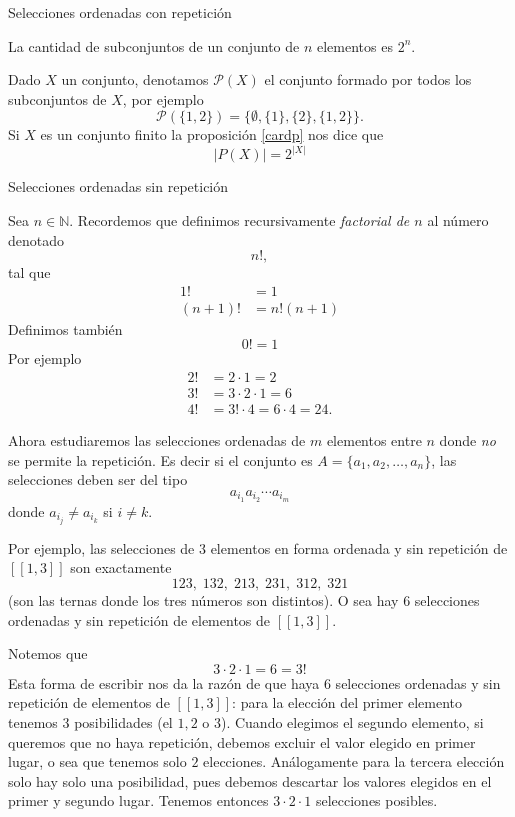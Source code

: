 \begin{section}{Selecciones ordenadas con repetición}
\begin{ejemplo}
\begin{proposicion}\label{cardp} La cantidad de subconjuntos de  
un conjunto de $n$ elementos es $2^n$.
\end{proposicion}

Dado  $X$ un conjunto, denotamos $\mathcal P(X)$ el  conjunto  formado por todos los subconjuntos de $X$, por ejemplo
$$
\mathcal P(\{1,2\}) = \{\emptyset,\{1\},\{2\},\{1,2\}\}.
$$  
Si $X$ es un conjunto finito la proposición \ref{cardp} nos dice que
$$
\mathcal |P(X)| = 2^{|X|}
$$
\end{ejemplo}





\end{section}

\begin{section}{Selecciones ordenadas sin repetición}\label{permutaciones}

Sea $n \in \mathbb{N}$. Recordemos  que  definimos recursivamente \emph{factorial de $n$} al número denotado 
$$n!,$$
tal que
\begin{align*}
1! &= 1\\
(n + 1)! &= n!  (n + 1)
\end{align*}
Definimos también
$$0! = 1$$
Por ejemplo
\begin{align*}
2! &= 2 \cdot 1 = 2 \\
3! &= 3 \cdot 2 \cdot 1 = 6 \\
4! &= 3!\cdot 4 = 6 \cdot 4 = 24. 
\end{align*}


Ahora estudiaremos las selecciones ordenadas de $m$ elementos entre $n$ donde {\em no} se permite la repetición. Es decir si  el conjunto es $A= \{a_1,a_2,\ldots,a_n\}$, las selecciones deben ser del tipo 
$$
a_{i_1} a_{i_2} \cdots a_{i_m}
$$
donde  $a_{i_j} \not= a_{i_k}$ si $i\not=k$. 

Por ejemplo, las selecciones de $3$ elementos en forma ordenada y sin repetición de $[[1, 3]]$  son exactamente
$$
1 2 3,\; 1 3 2,\; 2 1 3,\; 2 3 1,\; 3 1 2,\; 3 2 1
$$
(son las ternas donde los tres números son distintos). O sea hay $6$ selecciones ordenadas y sin repetición de  elementos de $[[1, 3]]$.

Notemos que
$$
3 \cdot 2 \cdot 1 = 6 = 3!
$$
Esta forma de escribir nos da la razón de que haya $6$ selecciones ordenadas y sin repetición de  elementos de $[[1, 3]]$: para la elección del primer elemento tenemos $3$ posibilidades (el $1, 2$ o $3$). Cuando elegimos el segundo elemento, si queremos que no haya repetición, debemos excluir el valor elegido en primer lugar, o sea que tenemos solo $2$ elecciones. Análogamente para la tercera elección solo hay solo una posibilidad, pues debemos descartar los valores elegidos en el primer y segundo lugar. Tenemos entonces  $3 \cdot 2 \cdot 1$ selecciones posibles.


\end{section}
